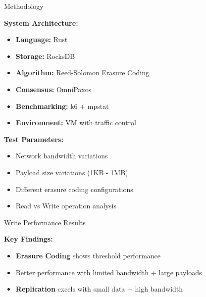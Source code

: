 \documentclass[a2,portrait]{config/poster/a0poster}
\newcommand{\postersection}[1]{%
	\begin{tcolorbox}[
			colback=ITBblue,
			colframe=ITBblue,
			fonttitle=\bfseries,
			coltext=white,
			sharp corners,
			boxrule=0pt,
			top=0pt,
			bottom=0pt,
			halign=center
		]
		\normalsize #1
	\end{tcolorbox}%
}
\begin{document}
\begin{multicols}{4}

	\postersection{Methodology}
	
	\textbf{System Architecture:}
	\begin{itemize}
		\item \textbf{Language:} Rust
		\item \textbf{Storage:} RocksDB
		\item \textbf{Algorithm:} Reed-Solomon Erasure Coding
		\item \textbf{Consensus:} OmniPaxos
		\item \textbf{Benchmarking:} k6 + mpstat
		\item \textbf{Environment:} VM with traffic control
	\end{itemize}

	\textbf{Test Parameters:}
	\begin{itemize}
		\item Network bandwidth variations
		\item Payload size variations (1KB - 1MB)
		\item Different erasure coding configurations
		\item Read vs Write operation analysis
	\end{itemize}


	\postersection{Write Performance Results}
	

	\textbf{Key Findings:}
	\begin{itemize}
		\item \textcolor{ECcolor}{\textbf{Erasure Coding}} shows threshold performance
		\item Better performance with limited bandwidth + large payloads
		\item \textcolor{REPcolor}{\textbf{Replication}} excels with small data + high bandwidth
	\end{itemize}



\end{multicols}
\end{document}
